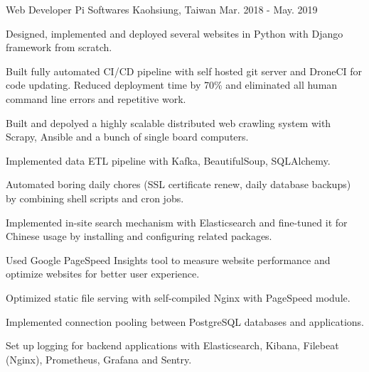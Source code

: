 \begin{cventries}
  \cventry
    {Web Developer} %
    {Pi Softwares} %
    {Kaohsiung, Taiwan} %
    {Mar. 2018 - May. 2019} %
    {
      \begin{cvitems} %
        \item {Designed, implemented and deployed several websites in Python with Django framework from scratch.}
        \item {Built fully automated CI/CD pipeline with self hosted git server and DroneCI for code updating. Reduced deployment time by 70\% and eliminated all human command line errors and repetitive work. }
        \item {Built and depolyed a highly scalable distributed web crawling system with Scrapy, Ansible and a bunch of single board computers.}
        \item {Implemented data ETL pipeline with Kafka, BeautifulSoup, SQLAlchemy.}
        \item {Automated boring daily chores (SSL certificate renew, daily database backups) by combining shell scripts and cron jobs. }
        \item {Implemented in-site search mechanism with Elasticsearch and fine-tuned it for Chinese usage by installing and configuring related packages.}
        \item {Used Google PageSpeed Insights tool to measure website performance and optimize websites for better user experience. }
        \item {Optimized static file serving with self-compiled Nginx with PageSpeed module. }
        \item {Implemented connection pooling between PostgreSQL databases and applications.}
        \item {Set up logging for backend applications with Elasticsearch, Kibana, Filebeat (Nginx), Prometheus, Grafana and Sentry.}
      \end{cvitems}
    }

\end{cventries}
